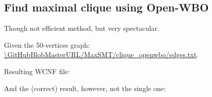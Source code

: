 \subsection{Find maximal clique using Open-WBO}

\renewcommand{\CURPATH}{MaxSMT/clique_openwbo}

Though not efficient method, but very spectacular.

Given the 50-vertices graph: \url{\GitHubBlobMasterURL/\CURPATH/edges.txt}.



Resulting WCNF file:



And the (correct) result, however, not the single one:




